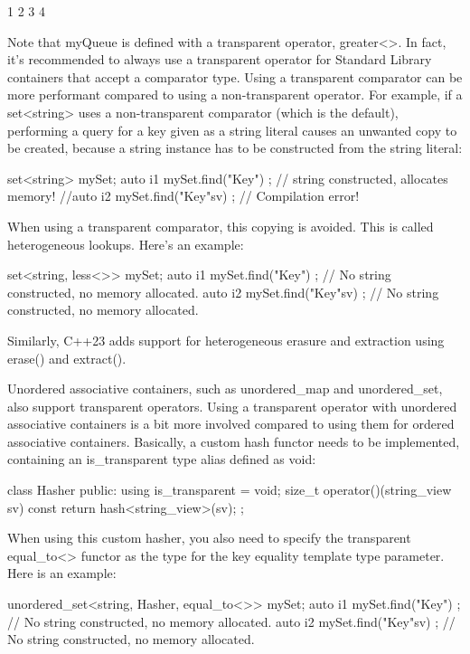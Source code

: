 \begin{shell}
1 2 3 4
\end{shell}

Note that myQueue is defined with a transparent operator, greater<>. In fact, it’s recommended to always use a transparent operator for Standard Library containers that accept a comparator type. Using a transparent comparator can be more performant compared to using a non-transparent operator. For example, if a set<string> uses a non-transparent comparator (which is the default), performing a query for a key given as a string literal causes an unwanted copy to be created, because a string instance has to be constructed from the string literal:

\begin{cpp}
set<string> mySet;
auto i1 { mySet.find("Key") }; // string constructed, allocates memory!
//auto i2 { mySet.find("Key"sv) }; // Compilation error!
\end{cpp}

When using a transparent comparator, this copying is avoided. This is called heterogeneous lookups. Here’s an example:

\begin{cpp}
set<string, less<>> mySet;
auto i1 { mySet.find("Key") }; // No string constructed, no memory allocated.
auto i2 { mySet.find("Key"sv) }; // No string constructed, no memory allocated.
\end{cpp}

Similarly, C++23 adds support for heterogeneous erasure and extraction using erase() and extract().

Unordered associative containers, such as unordered\_map and unordered\_set, also support transparent operators. Using a transparent operator with unordered associative containers is a bit more involved compared to using them for ordered associative containers. Basically, a custom hash functor needs to be implemented, containing an is\_transparent type alias defined as void:

\begin{cpp}
class Hasher
{
    public:
        using is_transparent = void;
        size_t operator()(string_view sv) const { return hash<string_view>{}(sv); }
};
\end{cpp}

When using this custom hasher, you also need to specify the transparent equal\_to<> functor as the type for the key equality template type parameter. Here is an example:

\begin{cpp}
unordered_set<string, Hasher, equal_to<>> mySet;
auto i1 { mySet.find("Key") }; // No string constructed, no memory allocated.
auto i2 { mySet.find("Key"sv) }; // No string constructed, no memory allocated.
\end{cpp}

